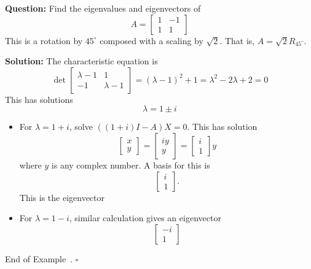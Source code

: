 \documentclass[10pt]{article}
\theoremstyle{definition}
\newtheorem{example}[theorem]{Example}
\renewenvironment{example}
{\begin{oldexample}}
  {\par\smallskip\hfill   End of Example~\theexample. $\square$    \par\end{oldexample}}
\newcommand{\Fl}[1]{\vspace{5mm}\noindent\textbf{#1}}%
\begin{document}
\begin{example}
  \Fl{Question:} Find the eigenvalues and eigenvectors of
  \begin{equation*}
    A=
    \begin{bmatrix}
      1&-1\\1&1
    \end{bmatrix}
  \end{equation*}
  This is a rotation by $45^{\circ}$ composed with a scaling by $\sqrt{2}$.
  That is, $A=\sqrt{2}R_{45^{\circ}}$.
  
  \Fl{Solution:} The characteristic equation is
  \begin{equation*}
    \det
    \begin{bmatrix}
      \lambda-1&1\\-1&\lambda-1
    \end{bmatrix}
    = (\lambda-1)^{2}+1 = \lambda^{2}-2\lambda +2=0
  \end{equation*}
  This has solutions
  \begin{equation*}
    \lambda=1\pm i
  \end{equation*}
  \begin{itemize}
    \item For $\lambda=1+i$, solve  $((1+i)I-A)X=0$. This has solution
    \begin{equation*}
      \begin{bmatrix}
        x\\y
      \end{bmatrix}
      =
      \begin{bmatrix}
        iy\\y
      \end{bmatrix}
      =
      \begin{bmatrix}
        i\\1
      \end{bmatrix}y
    \end{equation*}
    where $y$ is any complex number. A basis for this is
    \begin{equation*}
      \begin{bmatrix}
        i\\1
      \end{bmatrix}.
    \end{equation*}
    This is the eigenvector
    \item For $\lambda=1-i$, similar calculation gives an eigenvector
    \begin{equation*}
      \begin{bmatrix}
        -i\\1
      \end{bmatrix}
    \end{equation*}
  \end{itemize}
  
\end{example}
\end{document}
